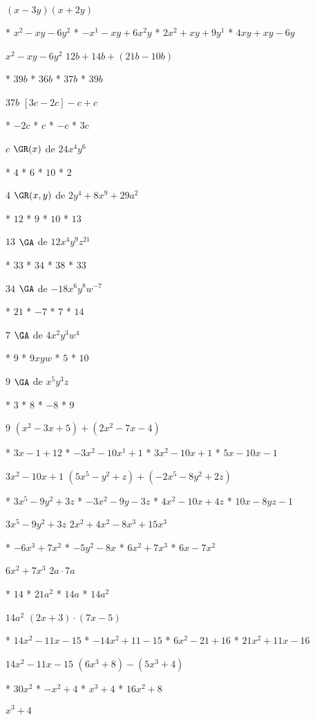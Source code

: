 $(x-3y)(x+2y)$
\begin{enum}
	* $x^2-xy-6y^2$
	* $-x^1-xy+6x^2y$
	* $2x^2+xy+9y^1$
	* $4xy+xy-6y$
\end{enum}
$x^2-xy-6y^2$
$12b+14b+(21b-10b)$
\begin{enum}
	* $39b$
	* $36b$
	* $37b$
	* $39b$
\end{enum}
$37b$
$[3c-2c]-c+c$
\begin{enum}
	* $-2c$
	* $c$
	* $-c$
	* $3c$
\end{enum}
$c$
$\GR(x)$ de $24x^4y^6$
\begin{enum}
	* $4$
	* $6$
	* $10$
	* $2$
\end{enum}
$4$
$\GR(x,y)$ de $2y^4+8x^9+29a^2$
\begin{enum}
	* $12$
	* $9$
	* $10$
	* $13$
\end{enum}
$13$
$\GA$ de $12x^4y^9z^{21}$
\begin{enum}
	* $33$
	* $34$
	* $38$
	* $33$
\end{enum}
$34$
$\GA$ de $-18x^6y^8w^{-7}$
\begin{enum}
	* $21$
	* $-7$
	* $7$
	* $14$
\end{enum}
$7$
$\GA$ de $4x^2y^3w^4$
\begin{enum}
	* $9$
	* $9xyw$
	* $5$
	* $10$
\end{enum}
$9$
$\GA$ de $x^5y^3z$
\begin{enum}
	* $3$
	* $8$
	* $-8$
	* $9$
\end{enum}
$9$
$\left(x^2-3x+5\right)+\left(2x^2-7x-4\right)$
\begin{enum}
	* $3x-1+12$
	* $-3x^2-10x^1+1$
	* $3x^2-10x+1$
	* $5x-10x-1$
\end{enum}
$3x^2-10x+1$
$\left(5x^5-y^2+z\right)+\left(-2x^5-8y^2+2z\right)$
\begin{enum}
	* $3x^5-9y^2+3z$
	* $-3x^2-9y-3z$
	* $4x^2-10x+4z$
	* $10x-8yz-1$
\end{enum}
$3x^5-9y^2+3z$
$2x^2+4x^2-8x^3+15x^3$
\begin{enum}
	* $-6x^3+7x^2$
	* $-5y^2-8x$
	* $6x^2+7x^3$
	* $6x-7x^2$
\end{enum}
$6x^2+7x^3$
$2a\cdot 7a$
\begin{enum}
	* $14$
	* $21a^2$
	* $14a$
	* $14a^2$
\end{enum}
$14a^2$
$(2x+3)\cdot(7x-5)$
\begin{enum}
	* $14x^2-11x-15$
	* $-14x^2+11-15$
	* $6x^2-21+16$
	* $21x^2+11x-16$
\end{enum}
$14x^2-11x-15$
$\left(6x^3+8\right)-\left(5x^3+4\right)$
\begin{enum}
	* $30x^2$
	* $-x^2+4$
	* $x^3+4$
	* $16x^2+8$
\end{enum}
$x^3+4$
